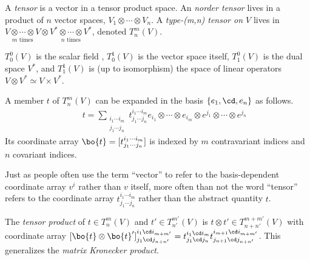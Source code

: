 \documentclass[11pt,fleqn]{article}
\numberwithin{equation}{section}
\begin{document}
\begin{dfn}\label{tensor}
A \textit{tensor} is a vector in a tensor product space.
An \textit{n\eth order tensor} lives in a product of $n$ vector spaces, $V_1\otimes\cdots\otimes V_n$.
A \textit{type-(m,n) tensor on $V$} lives in $\underset{\text{$m$ times}}{V\otimes\cdots\otimes V}\otimes \underset{\text{$n$ times}}{V^*\otimes\cdots \otimes V^*}$, denoted $T_n^m(V)$.
\end{dfn}

\begin{ex}
$T_0^0(V)$ is the scalar field ,
$T_0^1(V)$ is the vector space itself, $T_1^0(V)$ is the dual space $V^*$, and $T_1^1(V)$ is (up to isomorphism) the space of linear operators $V\otimes V^*\simeq V\times V^*$.
\end{ex}

\begin{rmk}
A member $t$ of $T_n^m(V)$ can be expanded in the basis $\{e_1,\cd,e_n\}$ as follows.
\begin{align}
&&
  t
=
  \sum_{\substack{i_1\cdots i_m\\j_1\cdots j_n}}
  t_{j_1\cdots j_n}^{i_1\cdots i_m}
  e_{i_1}\otimes\cdots\otimes e_{i_m}\otimes e^{j_1}\otimes\cdots\otimes e^{j_n}
\end{align}
Its coordinate array $\bo{t}=[t^{i_1\cdots i_m}_{j_1\cdots j_n}]$ is indexed by $m$ contravariant indices and $n$ covariant indices.
\end{rmk}

\begin{rmk}
Just as people often use the term ``vector'' to refer to the basis-dependent coordinate array $v^i$ rather than $v$ itself, more often than not the word ``tensor'' refers to the coordinate array $t^{i_1\cdots i_m}_{j_1\cdots j_n}$ rather than the abstract quantity $t$.
\end{rmk}

\begin{dfn}
The \textit{tensor product} of $t\in T_n^m(V)$ and $t'\in T_{n'}^{m'}(V)$ is $t\otimes t'\in T_{n+n'}^{m+m'}(V)$ with coordinate array $[\bo{t}\otimes \bo{t}']_{j_1\cd j_{n+n'}}^{i_1\cd i_{m+m'}} = t_{j_1\cd j_n}^{i_1\cd i_m}t_{j_{n+1}\cd j_{n+n'}}^{i_{m+1}\cd i_{m+m'}}$.
This generalizes the \textit{matrix Kronecker product}.
\end{dfn}
\end{document}
